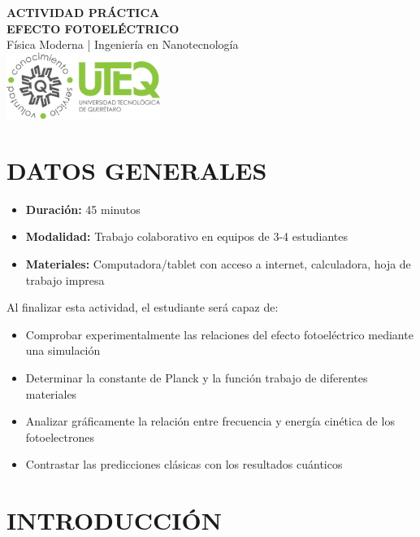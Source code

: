 \documentclass[12pt,a4paper]{article}
\begin{document}
	
	\begin{center}
		{\Huge \textbf{ACTIVIDAD PRÁCTICA}}\\[0.3cm]
		{\LARGE \textbf{EFECTO FOTOELÉCTRICO}}\\[0.2cm]
		{\large Física Moderna | Ingeniería en Nanotecnología}\\[0.5cm]
		\includegraphics[width=5cm]{../../Imagenes/Logo_uteq}
	\end{center}
	
	\vspace{0.5cm}
	
	\section*{DATOS GENERALES}
	\begin{itemize}
		\item \textbf{Duración:} 45 minutos
		\item \textbf{Modalidad:} Trabajo colaborativo en equipos de 3-4 estudiantes
		\item \textbf{Materiales:} Computadora/tablet con acceso a internet, calculadora, hoja de trabajo impresa
	\end{itemize}
	
	\begin{objetivobox}
		Al finalizar esta actividad, el estudiante será capaz de:
		\begin{itemize}
			\item Comprobar experimentalmente las relaciones del efecto fotoeléctrico mediante una simulación
			\item Determinar la constante de Planck y la función trabajo de diferentes materiales
			\item Analizar gráficamente la relación entre frecuencia y energía cinética de los fotoelectrones
			\item Contrastar las predicciones clásicas con los resultados cuánticos
		\end{itemize}
	\end{objetivobox}
	
	\section*{INTRODUCCIÓN}
	
\end{document}
